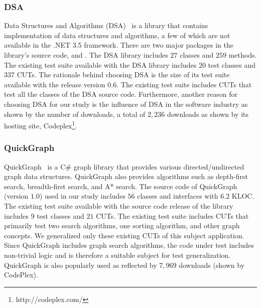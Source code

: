 \subsubsection{DSA}

Data Structures and Algorithms (DSA)~\cite{dsa} is a library that contains implementation of data structures and algorithms, a few of which are not available in the .NET 3.5 framework. There are two major packages in the library's source code,  and . The DSA library includes $27$ classes and $259$ methods. The existing test suite available with the DSA library includes $20$ test classes and $337$ CUTs. The rationale behind choosing DSA is the size of its test suite available with the release version $0.6$. The existing test suite includes CUTs that test all the classes of the DSA source code. Furthermore, another reason for choosing DSA for our study is the influence of DSA in the software industry as shown by the number of downloads, a total of $2,236$ downloads as shown by its hosting site, Codeplex\footnote{http://codeplex.com/}. 

\subsubsection{QuickGraph}

QuickGraph~\cite{quickgraph} is a C\# graph library that provides various directed/undirected graph data structures. QuickGraph also provides algorithms such as depth-first search, breadth-first search, and A* search. The source code of QuickGraph (version $1.0$) used in our study includes $56$ classes and interfaces with $6.2$ KLOC. The existing test suite available with the source code release of the library includes $9$ test classes and $21$ CUTs. The existing test suite includes CUTs that primarily test two search algorithms, one sorting algorithm, and other graph concepts. We generalized only these existing CUTs of this subject application. Since QuickGraph includes graph search algorithms, the code under test includes non-trivial logic and is therefore a suitable subject for test generalization. QuickGraph is also popularly used as reflected by $7,969$ downloads (shown by CodePlex).



